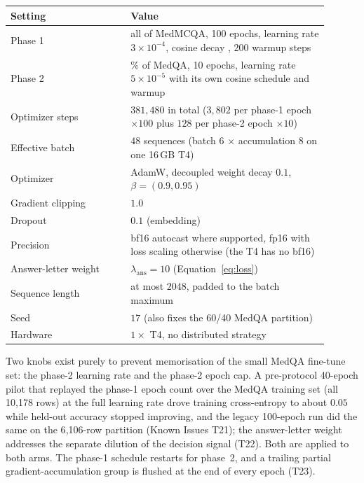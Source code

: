 \documentclass[11pt,a4paper]{article}
\newcommand{\lam}{\lambda}
\theoremstyle{plain}
\theoremstyle{definition}
\theoremstyle{remark}
\begin{document}
\begin{center}
\small
\begin{tabular}{@{}>{\raggedright\arraybackslash}p{0.34\linewidth}>{\raggedright\arraybackslash}p{0.56\linewidth}@{}}
\toprule
Setting & Value \\
\midrule
Phase 1 & all of MedMCQA, 100 epochs, learning rate $3\times10^{-4}$, cosine
  decay \cite{loshchilov2016sgdr}, 200 warmup steps \\
Phase 2 & 60\% of MedQA, 10 epochs, learning rate $5\times10^{-5}$ with its own
  cosine schedule and warmup \\
Optimizer steps & $381{,}480$ in total ($3{,}802$ per phase-1 epoch $\times 100$
  plus $128$ per phase-2 epoch $\times 10$) \\
Effective batch & $48$ sequences (batch $6$ $\times$ accumulation $8$ on one
  16\,GB T4) \\
Optimizer & AdamW, decoupled weight decay $0.1$, $\beta=(0.9,0.95)$
  \cite{loshchilov2017adamw} \\
Gradient clipping & $1.0$ \\
Dropout & $0.1$ (embedding) \\
Precision & bf16 autocast where supported, fp16 with loss scaling otherwise
  (the T4 has no bf16) \\
Answer-letter weight & $\lam_{\mathrm{ans}}=10$ (Equation~\ref{eq:loss}) \\
Sequence length & at most $2048$, padded to the batch maximum \\
Seed & $17$ (also fixes the 60/40 MedQA partition) \\
Hardware & $1\times$ T4, no distributed strategy \\
\bottomrule
\end{tabular}
\end{center}

\noindent
Two knobs exist purely to prevent memorisation of the small MedQA fine-tune
set: the phase-2 learning rate and the phase-2 epoch cap. A pre-protocol
40-epoch pilot that replayed the phase-1 epoch count over the MedQA training
set (all 10{,}178 rows) at the full learning rate drove training
cross-entropy to about $0.05$ while held-out accuracy stopped improving, and
the legacy 100-epoch run did the same on the 6{,}106-row partition (Known
Issues T21); the answer-letter weight
addresses the separate dilution of the decision signal (T22). Both are applied
to both arms. The phase-1 schedule restarts for phase~2, and a trailing
partial gradient-accumulation group is flushed at the end of every epoch
(T23).
\end{document}
